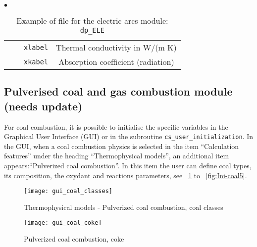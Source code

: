 {{\begin{list}{$\bullet$}{}
\begin{table}[htbp]
\begin{center}
{\begin{tabular}{|c|l|c|c|}
        &                    &    \texttt{xlabel}               & Thermal conductivity in W/(m K)                    \\
        &                    &    \texttt{xkabel\index{xkabel}} & Absorption coefficient (radiation)                 \\   \hline
\end{tabular}
}
\caption{Example of file for the electric arcs module:
 \texttt{dp\_ELE}}\label{tab:dpELE}
\end{center}
\end{table}

\end{list}

\clearpage


\subsection[Pulverised coal and gas combustion module]
{Pulverised coal and gas combustion module (needs update)}
\label{sec:Ini-coal}
For coal combustion, it is possible to initialise the specific variables in the Graphical User Interface (GUI) or in the subroutine \texttt{cs\_user\_initialization}. In the GUI, when a coal combustion physics is selected in the item ``Calculation features'' under the heading ``Thermophysical models'', an additional item appears:``Pulverized coal combustion''. In this item the user can define coal types, its composition, the oxydant and reactions parameters, see \figurename~\ref{fig:Ini-coal1} to \figurename~\ref{fig:Ini-coal5}.

\begin{figure}[!ht]
\begin{center}
\texttt{[image: gui\_coal\_classes]}
\caption{Thermophysical models - Pulverized coal combustion, coal classes}
\label{fig:Ini-coal1}
\end{center}
\end{figure}

\begin{figure}[!ht]
\begin{center}
\texttt{[image: gui\_coal\_coke]}
\caption{Pulverized coal combustion, coke}
\label{fig:Ini-coal2}
\end{center}
\end{figure}

}}
